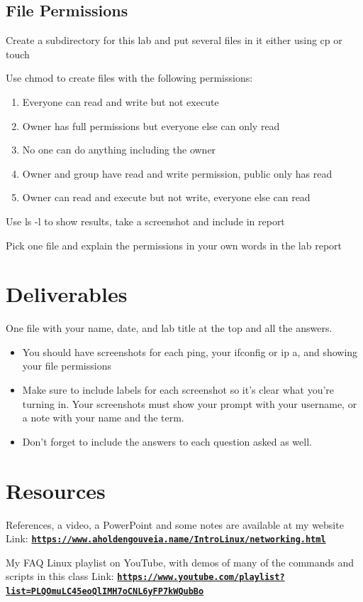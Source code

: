 \documentclass[12pt]{article}
\begin{document}
\subsection*{File Permissions}

Create a subdirectory for this lab and put several files in it either using cp or touch


Use chmod to create files with the following permissions:
    \begin{enumerate}
        \item Everyone can read and write but not execute
        \item Owner has full permissions but everyone else can only read
        \item No one can do anything including the owner
        \item Owner and group have read and write permission, public only has read
        \item Owner can read and execute but not write, everyone else can read
    \end{enumerate}


Use ls -l to show results, take a screenshot and include in report

Pick one file and explain the permissions in your own words in the lab report


\section*{Deliverables}
 One file with your name, date, and lab title at the top and all the answers. 
 \begin{itemize}
        \item You should have screenshots for each ping, your ifconfig or ip a, and showing your file permissions
        \item Make sure to include labels for each screenshot so it's clear what you're turning in. Your screenshots must show your prompt with your username, or a note with your name and the term.
        \item Don't forget to include the answers to each question asked as well. 
\end{itemize}
\section*{Resources}
References, a video, a PowerPoint and some notes are available at my website
Link: \href{https://www.aholdengouveia.name/IntroLinux/networking.html}{\textbf{\nolinkurl{https://www.aholdengouveia.name/IntroLinux/networking.html}}}

My FAQ Linux playlist on YouTube, with demos of many of the commands and scripts in this class
Link: \href{https://www.youtube.com/playlist?list=PLQOmuLC45eoQlIMH7oCNL6yFP7kWQubBo}{\textbf{\nolinkurl{https://www.youtube.com/playlist?list=PLQOmuLC45eoQlIMH7oCNL6yFP7kWQubBo}}}
\end{document}
